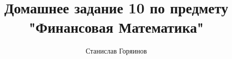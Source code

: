 

\date{}
\title{Домашнее задание 10 по предмету "Финансовая Математика"}
\author{Станислав Горяинов}


\maketitle




